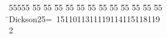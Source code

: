 %
%
\begin{tabbing}
55555 \= 55 \= 55 \= 55 \= 55 \= 55 \= 55 \= 55 \= 55 \= 55 \= 55 \= 55 \= 55 \= \>Dickson25=\ 1511011311119114115118119\ \\[0pt]
2\>\end{tabbing}
